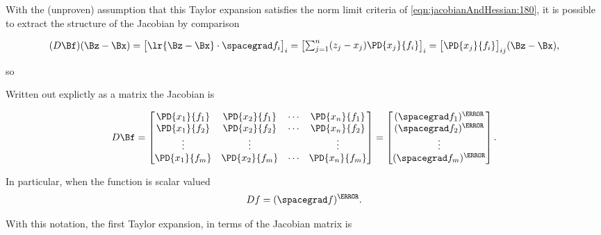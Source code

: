 With the (unproven) assumption that this Taylor expansion satisfies the norm limit criteria of \cref{eqn:jacobianAndHessian:180}, it is possible to extract the structure of the Jacobian by comparison

\begin{dmath}\label{eqn:jacobianAndHessian:220}
(D \Bf)
(\Bz - \Bx)
=
{\begin{bmatrix}
\lr{ \Bz - \Bx } \cdot \spacegrad f_i
\end{bmatrix}}_i
=
{\begin{bmatrix}
\sum_{j = 1}^n (z_j - x_j) \PD{x_j}{f_i}
\end{bmatrix}}_i
=
{\begin{bmatrix}
\PD{x_j}{f_i}
\end{bmatrix}}_{ij}
(\Bz - \Bx),
\end{dmath}

so

Written out explictly as a matrix the Jacobian is

\begin{equation}\label{eqn:jacobianAndHessian:320}
D \Bf
=
\begin{bmatrix}
\PD{x_1}{f_1} & \PD{x_2}{f_1} & \cdots & \PD{x_n}{f_1} \\
\PD{x_1}{f_2} & \PD{x_2}{f_2} & \cdots & \PD{x_n}{f_2} \\
\vdots & \vdots & & \vdots \\
\PD{x_1}{f_m} & \PD{x_2}{f_m} & \cdots & \PD{x_n}{f_m} \\
\end{bmatrix}
=
\begin{bmatrix}
(\spacegrad f_1)^\T \\
(\spacegrad f_2)^\T \\
\vdots \\
(\spacegrad f_m)^\T
\end{bmatrix}.
\end{equation}

In particular, when the function is scalar valued
\begin{dmath}\label{eqn:jacobianAndHessian:360}
D f = (\spacegrad f)^\T.
\end{dmath}

With this notation, the first Taylor expansion, in terms of the Jacobian matrix is

